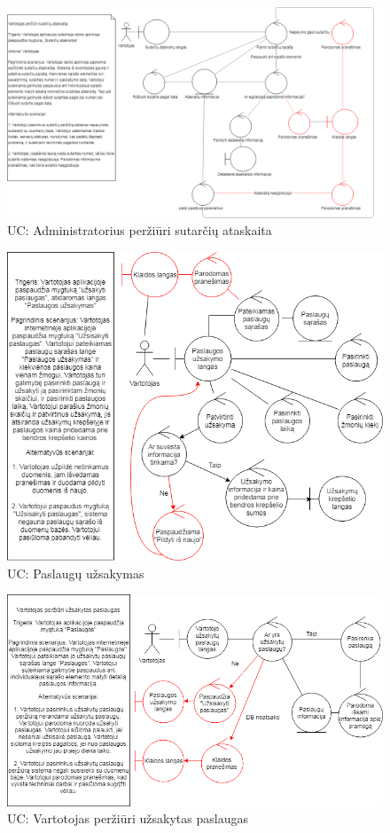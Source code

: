 \documentclass[oneside]{VUMIFPSkursinis}
\begin{document}
\begin{figure}[h]
    \centering
    \includegraphics[width=1.0\textwidth]{Rob5.png}
    \caption{UC: Administratorius peržiūri sutarčių ataskaita}
    \label{fig:rob5}
\end{figure}
\vskip 1cm

\begin{figure}[h]
    \centering
    \includegraphics[width=1.0\textwidth]{rob6.png}
    \caption{UC: Paslaugų užsakymas}
    \label{fig:rob6}
\end{figure}
\vskip 1cm

\begin{figure}[h]
    \centering
    \includegraphics[width=1.0\textwidth]{rob7.png}
    \caption{UC: Vartotojas peržiūri užsakytas paslaugas}
    \label{fig:rob7}
\end{figure}
\vskip 1cm
\end{document}
